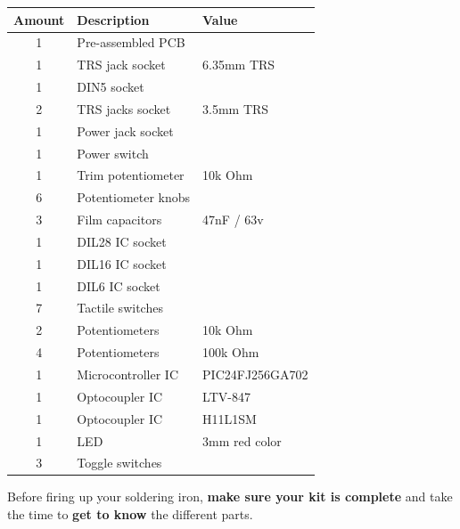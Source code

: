 \documentclass{scrartcl}
\begin{document}
\begin{center}
    \begin{tabular}{|c|l|l|}
        \hline
        \textbf{Amount} & \textbf{Description} & \textbf{Value} \\
        \hline
        1               & Pre-assembled PCB    &                \\
        1               & TRS jack socket      & 6.35mm TRS     \\
        1               & DIN5 socket          &                \\
        2               & TRS jacks socket     & 3.5mm TRS      \\
        1               & Power jack socket    &                \\
        1               & Power switch         &                \\
        1               & Trim potentiometer   & 10k Ohm        \\
        6               & Potentiometer knobs  &                \\
        3               & Film capacitors      & 47nF / 63v     \\
        1               & DIL28 IC socket      &                \\        
        1               & DIL16 IC socket      &                \\
        1               & DIL6 IC socket       &                \\
        7               & Tactile switches     &                \\
        2               & Potentiometers       & 10k Ohm        \\
        4               & Potentiometers       & 100k Ohm       \\
        1               & Microcontroller IC   & PIC24FJ256GA702 \\
        1               & Optocoupler IC       & LTV-847        \\
        1               & Optocoupler IC       & H11L1SM        \\
        1               & LED                  & 3mm red color  \\
        3               & Toggle switches      &                \\
        \hline
    \end{tabular}
\end{center}

\vspace{0.25cm}
Before firing up your soldering iron, \textbf{make sure your kit is complete} and take the time to \textbf{get to know} the different parts.
\end{document}
